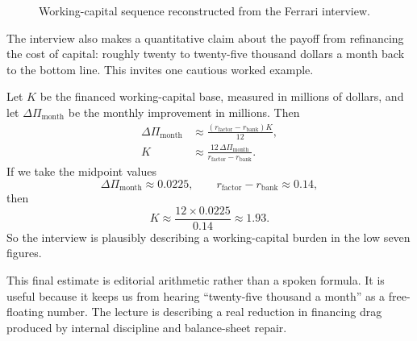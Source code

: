 \begin{figure}
\centering
{}
\caption{Working-capital sequence reconstructed from the Ferrari interview.}
\end{figure}

The interview also makes a quantitative claim about the payoff from refinancing the cost of capital: roughly twenty to twenty-five thousand dollars a month back to the bottom line. This invites one cautious worked example.

Let \(K\) be the financed working-capital base, measured in millions of dollars, and let \(\Delta \Pi_{\text{month}}\) be the monthly improvement in millions. Then
\begin{align}
\Delta \Pi_{\text{month}} &\approx \frac{(r_{\text{factor}}-r_{\text{bank}})K}{12},\\
K &\approx \frac{12\,\Delta \Pi_{\text{month}}}{r_{\text{factor}}-r_{\text{bank}}}.
\end{align}
If we take the midpoint values
\[
\Delta \Pi_{\text{month}} \approx 0.0225,\qquad
r_{\text{factor}}-r_{\text{bank}} \approx 0.14,
\]
then
\begin{equation}
K \approx \frac{12 \times 0.0225}{0.14} \approx 1.93.
\end{equation}
So the interview is plausibly describing a working-capital burden in the low seven figures.

\begin{remark}
This final estimate is editorial arithmetic rather than a spoken formula. It is useful because it keeps us from hearing ``twenty-five thousand a month'' as a free-floating number. The lecture is describing a real reduction in financing drag produced by internal discipline and balance-sheet repair.
\end{remark}

